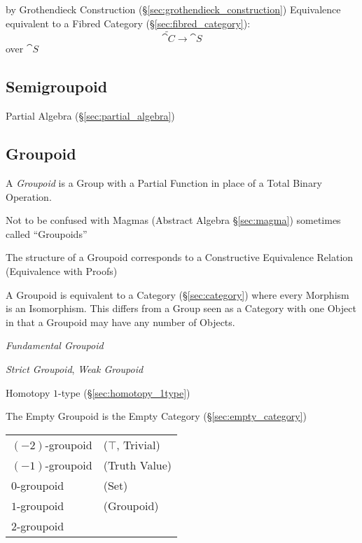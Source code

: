 by Grothendieck Construction (\S\ref{sec:grothendieck_construction})
Equivalence equivalent to a Fibred Category
(\S\ref{sec:fibred_category}):
\[
  \tilde{\cat{C}} \rightarrow \cat{S}
\]
over $\cat{S}$



\subsection{Semigroupoid}\label{sec:semigroupoid}

Partial Algebra (\S\ref{sec:partial_algebra})



\subsection{Groupoid}\label{sec:groupoid}

A \emph{Groupoid} is a Group with a Partial Function in place of a
Total Binary Operation.

\fist Not to be confused with Magmas (Abstract Algebra \S\ref{sec:magma})
sometimes called ``Groupoids''

The structure of a Groupoid corresponds to a Constructive Equivalence
Relation (Equivalence with Proofs)

A Groupoid is equivalent to a Category (\S\ref{sec:category}) where
every Morphism is an Isomorphism. This differs from a Group seen as a
Category with one Object in that a Groupoid may have any number of
Objects.

\emph{Fundamental Groupoid}

\emph{Strict Groupoid}, \emph{Weak Groupoid}

Homotopy $1$-type (\S\ref{sec:homotopy_1type})

The Empty Groupoid is the Empty Category (\S\ref{sec:empty_category})

\begin{tabular}{l l}
  $(-2)$-groupoid & ($\top$, Trivial) \\

  $(-1)$-groupoid & (Truth Value) \\

  $0$-groupoid    & (Set) \\

  $1$-groupoid    & (Groupoid) \\

  $2$-groupoid    & \\
\end{tabular}



